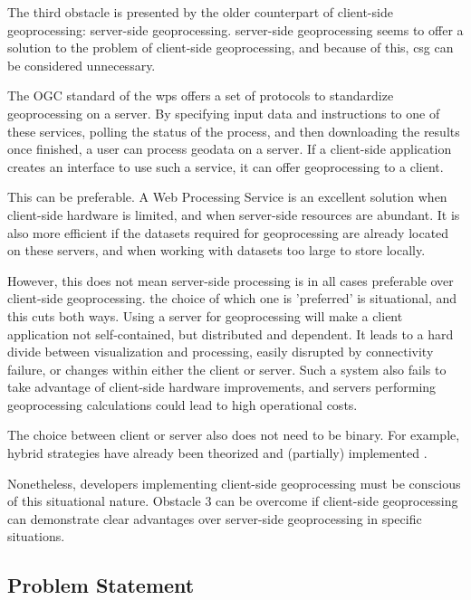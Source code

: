 The third obstacle is presented by the older counterpart of client-side geoprocessing: server-side geoprocessing. server-side geoprocessing seems to offer a solution to the problem of client-side geoprocessing, and because of this, \ac{csg} can be considered unnecessary.

The OGC standard of the \ac{wps} offers a set of protocols to standardize geoprocessing on a server. By specifying input data and instructions to one of these services, polling the status of the process, and then downloading the results once finished, a user can process geodata on a server. If a client-side application creates an interface to use such a service, it can offer geoprocessing to a client.

This can be preferable. A Web Processing Service is an excellent solution when client-side hardware is limited, and when server-side resources are abundant. It is also more efficient if the datasets required for geoprocessing are already located on these servers, and when working with datasets too large to store locally. 

However, this does not mean server-side processing is in all cases preferable over client-side geoprocessing. the choice of which one is 'preferred' is situational, and this cuts both ways. Using a server for geoprocessing will make a client application not self-contained, but distributed and dependent. It leads to a hard divide between visualization and processing, easily disrupted by connectivity failure, or changes within either the client or server. Such a system also fails to take advantage of client-side hardware improvements, and servers performing geoprocessing calculations could lead to high operational costs.

The choice between client or server also does not need to be binary. For example, hybrid strategies have already been theorized and (partially) implemented \cite{panidi_hybrid_2015}.

Nonetheless, developers implementing client-side geoprocessing must be conscious of this situational nature.
Obstacle 3 can be overcome if client-side geoprocessing can demonstrate clear advantages over server-side geoprocessing in specific situations. 

\newpage
\subsection{Problem Statement}

